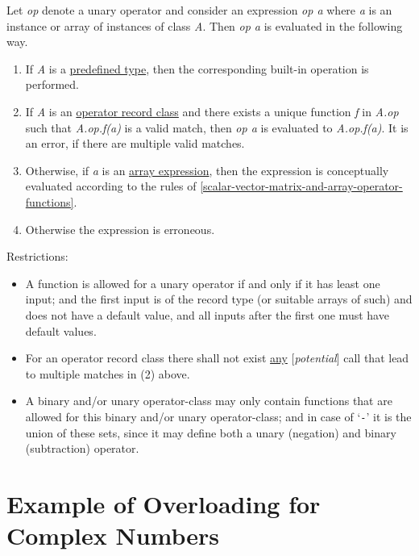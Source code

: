 Let \emph{op} denote a unary operator and consider an expression
\emph{op a} where \emph{a} is an instance or array of instances of class
\emph{A}. Then \emph{op a} is evaluated in the following way.

\begin{enumerate}
\item
  If \emph{A} is a \underline{predefined type}, then the corresponding built-in
  operation is performed.
\item
  If \emph{A} is an \underline{operator record class} and there exists a {unique}
  function \emph{f} in \emph{A.op} such that \emph{A.op.f(a)} is a valid
  match, then \emph{op a} is evaluated to \emph{A.op.f(a)}. It is an
  error, if there are multiple valid matches.
\item
  Otherwise, if \emph{a} is an \underline{array expression}, then the expression
  is conceptually evaluated according to the rules of \autoref{scalar-vector-matrix-and-array-operator-functions}.
\item
  Otherwise the expression is erroneous.
\end{enumerate}

Restrictions:

\begin{itemize}
\item
  A function is allowed for a unary operator if and only if it has least
  one input; and the first input is of the record type (or suitable
  arrays of such) and does not have a default value, and all inputs
  after the first one must have default values.
\item
  For an operator record class there shall not exist \underline{any}
  {[}\emph{potential}{]} call that lead to multiple matches in (2)
  above.
\item
  A binary and/or unary operator-class may only contain functions that
  are allowed for this binary and/or unary operator-class; and in case
  of `\lstinline!-!' it is the union of these sets, since it may define both a unary
  (negation) and binary (subtraction) operator.
\end{itemize}

\section{Example of Overloading for Complex Numbers}

